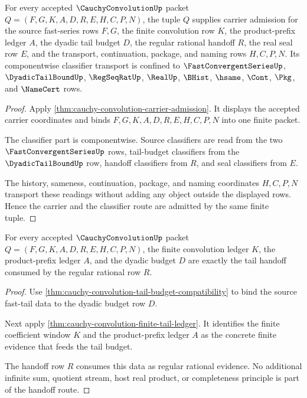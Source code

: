 \begin{theorem}
\label{thm:cauchy-convolution-carrier-classifier-admission}
For every accepted $\CauchyConvolutionUp$ packet $Q=(F,G,K,A,D,R,E,H,C,P,N)$, the tuple $Q$ supplies carrier admission for the source fast-series rows $F,G$, the finite convolution row $K$, the product-prefix ledger $A$, the dyadic tail budget $D$, the regular rational handoff $R$, the real seal row $E$, and the transport, continuation, package, and naming rows $H,C,P,N$. Its componentwise classifier transport is confined to $\FastConvergentSeriesUp$, $\DyadicTailBoundUp$, $\RegSeqRatUp$, $\RealUp$, $\BHist$, $\hsame$, $\Cont$, $\Pkg$, and $\NameCert$ rows.
\end{theorem}
\begin{proof}
Apply \autoref{thm:cauchy-convolution-carrier-admission}. It displays the accepted carrier coordinates and binds $F,G,K,A,D,R,E,H,C,P,N$ into one finite packet.

The classifier part is componentwise. Source classifiers are read from the two $\FastConvergentSeriesUp$ rows, tail-budget classifiers from the $\DyadicTailBoundUp$ row, handoff classifiers from $R$, and seal classifiers from $E$.

The history, sameness, continuation, package, and naming coordinates $H,C,P,N$ transport these readings without adding any object outside the displayed rows. Hence the carrier and the classifier route are admitted by the same finite tuple.
\end{proof}

\begin{theorem}
\label{thm:cauchy-convolution-tail-handoff-obligation}
For every accepted $\CauchyConvolutionUp$ packet $Q=(F,G,K,A,D,R,E,H,C,P,N)$, the finite convolution ledger $K$, the product-prefix ledger $A$, and the dyadic budget $D$ are exactly the tail handoff consumed by the regular rational row $R$.
\end{theorem}
\begin{proof}
Use \autoref{thm:cauchy-convolution-tail-budget-compatibility} to bind the source fast-tail data to the dyadic budget row $D$.

Next apply \autoref{thm:cauchy-convolution-finite-tail-ledger}. It identifies the finite coefficient window $K$ and the product-prefix ledger $A$ as the concrete finite evidence that feeds the tail budget.

The handoff row $R$ consumes this data as regular rational evidence. No additional infinite sum, quotient stream, host real product, or completeness principle is part of the handoff route.
\end{proof}

